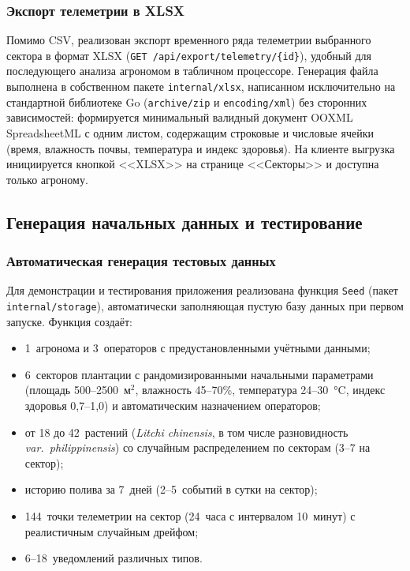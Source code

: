 \subsubsection{Экспорт телеметрии в XLSX}

Помимо CSV, реализован экспорт временного ряда телеметрии
выбранного сектора в формат XLSX
(\texttt{GET /api/export/telemetry/\{id\}}), удобный для
последующего анализа агрономом в табличном процессоре.
Генерация файла выполнена в собственном пакете
\texttt{internal/xlsx}, написанном исключительно на
стандартной библиотеке Go (\texttt{archive/zip} и
\texttt{encoding/xml}) без сторонних зависимостей:
формируется минимальный валидный документ OOXML
SpreadsheetML с одним листом, содержащим строковые и
числовые ячейки (время, влажность почвы, температура и
индекс здоровья). На клиенте выгрузка инициируется кнопкой
<<XLSX>> на странице <<Секторы>> и доступна только агроному.


\subsection{Генерация начальных данных и тестирование}

\subsubsection{Автоматическая генерация тестовых данных}

Для демонстрации и тестирования приложения реализована
функция \texttt{Seed} (пакет \texttt{internal/storage}),
автоматически заполняющая пустую базу данных при первом
запуске. Функция создаёт:
\begin{itemize}
    \item 1~агронома и 3~операторов с предустановленными
    учётными данными;
    \item 6~секторов плантации с рандомизированными
    начальными параметрами (площадь 500--2500~м$^2$,
    влажность 45--70\%, температура 24--30~°C, индекс
    здоровья 0{,}7--1{,}0) и автоматическим назначением
    операторов;
    \item от 18 до 42~растений (\textit{Litchi chinensis},
    в том числе разновидность \textit{var.~philippinensis})
    со случайным распределением по секторам (3--7 на сектор);
    \item историю полива за 7~дней (2--5~событий в сутки
    на сектор);
    \item 144~точки телеметрии на сектор (24~часа с
    интервалом 10~минут) с реалистичным случайным дрейфом;
    \item 6--18~уведомлений различных типов.
\end{itemize}

